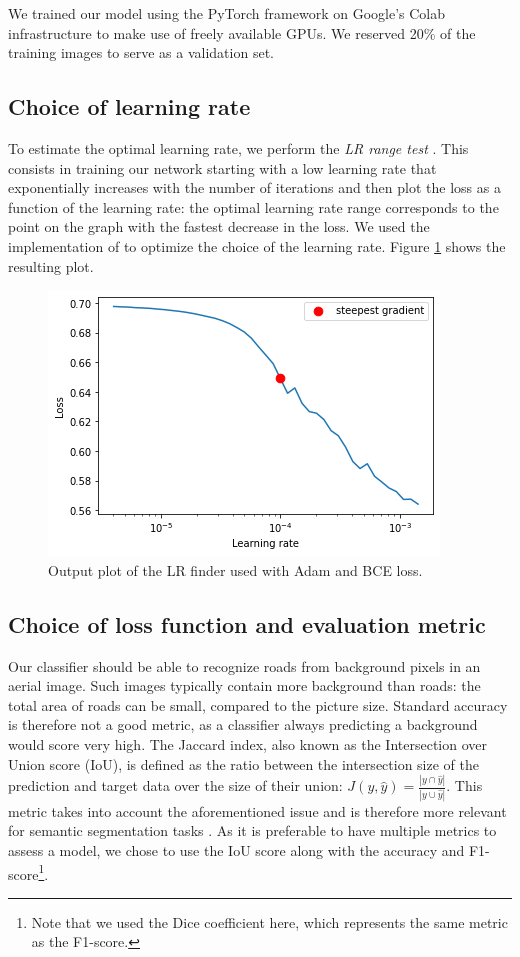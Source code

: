 \documentclass[10pt,conference,compsocconf]{IEEEtran}
\begin{document}
We trained our model using the PyTorch framework \cite{pytorch} on Google's Colab infrastructure to make use of freely available GPUs. We reserved 20\% of the training images to serve as a validation set. 

\subsection{Choice of learning rate}
\label{sec:choice_lr}

To estimate the optimal learning rate, we perform the \emph{LR range test}  \cite{lr_estimation}. This consists in training our network starting with a low learning rate that exponentially increases with the number of iterations and then plot the loss as a function of the learning rate: the optimal learning rate range corresponds to the point on the graph with the fastest decrease in the loss. We used the implementation of \cite{pytorch_lr_finder} to optimize the choice of the learning rate. Figure \ref{fig:lr_finder_plot} shows the resulting plot.

\begin{figure}[ht]
    \centering
    \includegraphics[width=0.6\linewidth]{doc/images/lr_finder_plot.png}
    \caption{Output plot of the LR finder used with Adam and BCE loss.}
    \label{fig:lr_finder_plot}
\end{figure}

\subsection{Choice of loss function and evaluation metric}

Our classifier should be able to recognize roads from background pixels in an aerial image. Such images typically contain more background than roads: the total area of roads can be small, compared to the picture size. Standard accuracy is therefore not a good metric, as a classifier always predicting a background would score very high. The Jaccard index, also known as the Intersection over Union score (IoU), is defined as the ratio between the intersection size of the prediction and target data over the size of their union: $J(y, \hat{y}) = \frac{|y \cap \hat{y}|}{|y \cup \hat{y}|}$. This metric takes into account the aforementioned issue and is therefore more relevant for semantic segmentation tasks \cite{reitsam_2020}. As it is preferable to have multiple metrics to assess a model, we chose to use the IoU score along with the accuracy and F1-score\footnote{Note that we used the Dice coefficient here, which represents the same metric as the F1-score.}. \\
\end{document}
